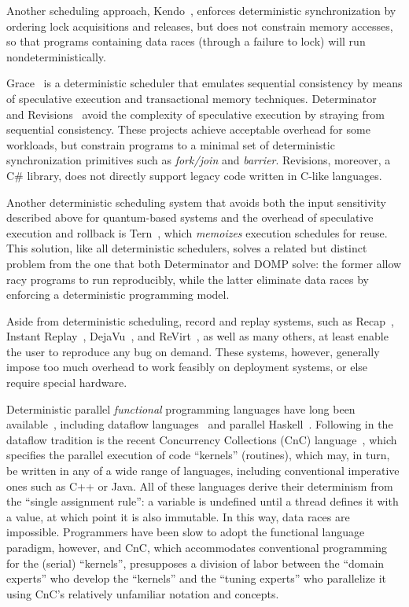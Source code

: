 Another scheduling approach, Kendo~\cite{olszewski09kendo}, enforces deterministic synchronization by ordering lock acquisitions and releases, but does not constrain memory accesses, so that programs containing data races (through a failure to lock) will run nondeterministically.

Grace~\cite{berger09grace} is a deterministic scheduler that emulates sequential consistency by means of speculative execution and transactional memory techniques.  Determinator~\cite{ford10efficient} and Revisions~\cite{burckhardt10revisions} avoid the complexity of speculative execution by straying from sequential consistency.  These projects achieve acceptable overhead for some workloads, but constrain programs to a minimal set of deterministic synchronization primitives such as \textit{fork/join} and \textit{barrier}.  Revisions, moreover, a C\# library, does not directly support legacy code written in C-like languages.

Another deterministic scheduling system that avoids both the input sensitivity described above for quantum-based systems and the overhead of speculative execution and rollback is Tern~\cite{cui10stable}, which \textit{memoizes} execution schedules for reuse.  This solution, like all deterministic schedulers, solves a related but distinct problem from the one that both Determinator and DOMP solve:  the former allow racy programs to run reproducibly, while the latter eliminate data races by enforcing a deterministic programming model.

Aside from deterministic scheduling, record and replay systems, such as Recap~\cite{pan88supporting}, Instant Replay~\cite{leblanc87debugging}, DejaVu~\cite{choi98deterministic}, and ReVirt~\cite{dunlap02revirt}, as well as many others, at least enable the user to reproduce any bug on demand.  These systems, however, generally impose too much overhead to work feasibly on deployment systems, or else require special hardware.

Deterministic parallel \textit{functional} programming languages
have long been available~\cite{hudak86parafunctional,roe91parallel}, including dataflow
languages~\cite{ackerman82dataflow,faustini82dataflow}
and parallel Haskell~\cite{aditya95ph,chakravarty07parallelHaskell,
jones93implicitExplicit,trinder02parallel}.  Following in the dataflow tradition
is the recent Concurrency Collections (CnC) language~\cite{budimlic10cnc},
which specifies the parallel
execution of code ``kernels'' (routines), which may, in turn, be written in any of a wide range of languages, including conventional imperative ones such as C++ or Java.  All of these languages derive their determinism from the ``single assignment rule'':  a variable is undefined until a thread defines it with a value, at which point it is also immutable.  In this way, data races are impossible.  Programmers have been slow to adopt the functional language paradigm, however, and CnC, which accommodates conventional programming for the (serial) ``kernels'', presupposes a division of labor between the ``domain experts'' who develop the ``kernels'' and the ``tuning experts'' who parallelize it using CnC's relatively unfamiliar notation and concepts.

